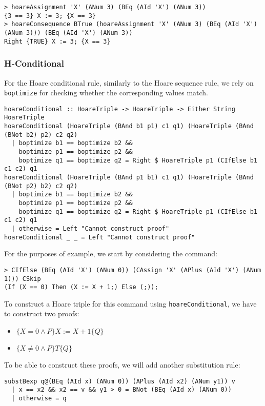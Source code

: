 \documentclass{article}
\begin{document}
\begin{lstlisting}
> hoareAssignment 'X' (ANum 3) (BEq (AId 'X') (ANum 3))
{3 == 3} X := 3; {X == 3}
> hoareConsequence BTrue (hoareAssignment 'X' (ANum 3) (BEq (AId 'X') (ANum 3))) (BEq (AId 'X') (ANum 3))
Right {TRUE} X := 3; {X == 3}
\end{lstlisting}

\subsubsection{H-Conditional}

For the Hoare conditional rule, similarly to the Hoare sequence rule, we rely on \texttt{boptimize} for checking whether the corresponding values match.

\begin{lstlisting}
hoareConditional :: HoareTriple -> HoareTriple -> Either String HoareTriple
hoareConditional (HoareTriple (BAnd b1 p1) c1 q1) (HoareTriple (BAnd (BNot b2) p2) c2 q2)
  | boptimize b1 == boptimize b2 &&
    boptimize p1 == boptimize p2 &&
    boptimize q1 == boptimize q2 = Right $ HoareTriple p1 (CIfElse b1 c1 c2) q1
hoareConditional (HoareTriple (BAnd p1 b1) c1 q1) (HoareTriple (BAnd (BNot p2) b2) c2 q2)
  | boptimize b1 == boptimize b2 &&
    boptimize p1 == boptimize p2 &&
    boptimize q1 == boptimize q2 = Right $ HoareTriple p1 (CIfElse b1 c1 c2) q1
  | otherwise = Left "Cannot construct proof"
hoareConditional _ _ = Left "Cannot construct proof"
\end{lstlisting}

For the purposes of example, we start by considering the command:

\begin{lstlisting}
> CIfElse (BEq (AId 'X') (ANum 0)) (CAssign 'X' (APlus (AId 'X') (ANum 1))) CSkip
(If (X == 0) Then (X := X + 1;) Else (;));
\end{lstlisting}

To construct a Hoare triple for this command using \texttt{hoareConditional}, we have to construct two proofs:

\begin{itemize}
\item $\{X = 0 \land P\} X := X + 1\{Q\}$
\item $\{X \neq 0 \land P\}T\{Q\}$
\end{itemize}

To be able to construct these proofs, we will add another substitution rule:

\begin{lstlisting}
substBexp q@(BEq (AId x) (ANum 0)) (APlus (AId x2) (ANum y1)) v
  | x == x2 && x2 == v && y1 > 0 = BNot (BEq (AId x) (ANum 0))
  | otherwise = q
\end{lstlisting}
\end{document}
